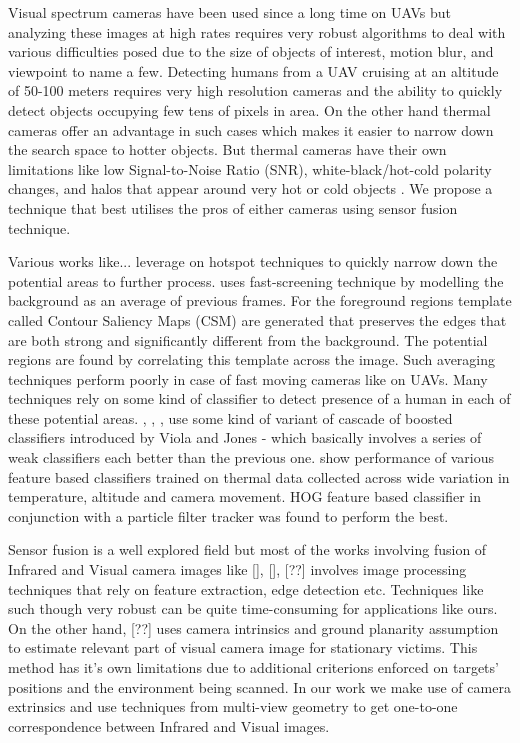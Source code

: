 \documentclass[runningheads]{llncs}
\begin{document}
Visual spectrum cameras have been used since a long time on UAVs but analyzing these images at high rates requires very robust algorithms to deal with various difficulties posed due to the size of objects of interest, motion blur, and viewpoint to name a few. Detecting humans from a UAV cruising at an altitude of 50-100 meters requires very high resolution cameras and the ability to quickly detect objects occupying few tens of pixels in area. On the other hand thermal cameras offer an advantage in such cases which makes it easier to narrow down the search space to hotter objects. But thermal cameras have their own limitations like low Signal-to-Noise Ratio (SNR), white-black/hot-cold polarity changes, and halos that appear around very hot or cold objects \cite{wang2010improved}. We propose a technique that best utilises the pros of either cameras using sensor fusion technique.

Various works like... leverage on hotspot techniques to quickly narrow down the potential areas to further process. \cite{davis2005two} uses fast-screening technique by modelling the background as an average of previous frames. For the foreground regions template called Contour Saliency Maps (CSM) are generated that preserves the edges that are both strong and significantly different from the background. The potential regions are found by correlating this template across the image. Such averaging techniques perform poorly in case of fast moving cameras like on UAVs. Many techniques rely on some kind of classifier to detect presence of a human in each of these potential areas. \cite{davis2005two}, \cite{1545530}, \cite{rudol2008human}, \cite{wang2010improved} use some kind of variant of cascade of boosted classifiers introduced by Viola and Jones \cite{viola2001rapid} - which basically involves a series of weak classifiers each better than the previous one. \cite{portmann2014people} show performance of various feature based classifiers trained on thermal data collected across wide variation in temperature, altitude and camera movement. HOG feature based classifier in conjunction with a particle filter tracker was found to perform the best.

Sensor fusion is a well explored field but most of the works involving fusion of Infrared and Visual camera images like [], [], [??] involves image processing techniques that rely on feature extraction, edge detection etc. Techniques like such though very robust can be quite time-consuming for applications like ours. On the other hand, [??] uses camera intrinsics and ground planarity assumption to estimate relevant part of visual camera image for stationary victims. This method has it's own limitations due to additional criterions enforced on targets' positions and the environment being scanned. In our work we make use of camera extrinsics and use techniques from multi-view geometry to get one-to-one correspondence between Infrared and Visual images.
\end{document}
